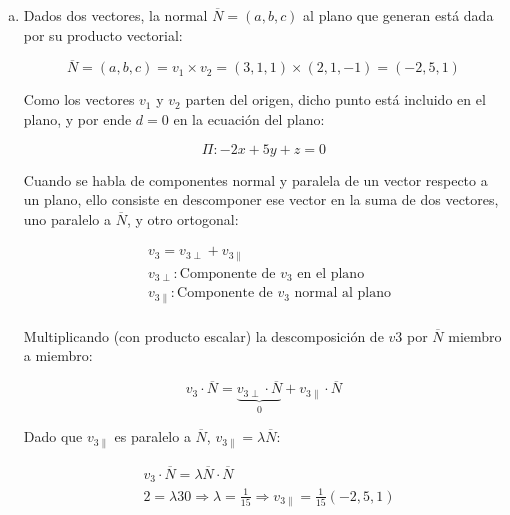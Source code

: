 \documentclass{article}
\begin{document}
\begin{enumerate}[(a)]
\item Dados dos vectores, la normal $\overline{N} = (a, b, c)$ al plano que generan está dada por su producto vectorial:

\begin{equation}
\overline{N} = (a, b, c) = v_1 \times v_2 = (3, 1, 1) \times (2, 1, -1) = (-2, 5, 1)
\end{equation}

Como los vectores $v_1$ y $v_2$ parten del origen, dicho punto está incluido en el plano, y por ende $d = 0$ en la ecuación del plano:

\begin{equation}
\Pi: -2x + 5y + z = 0
\end{equation}

Cuando se habla de componentes normal y paralela de un vector respecto a un plano, ello consiste en descomponer ese vector en la suma de dos vectores, uno paralelo a $\overline{N}$, y otro ortogonal:

\begin{subequations}
\begin{align}
& v_3 = v_{3\perp} + v_{3\parallel} \\
& v_{3\perp}: \text{Componente de } v_3 \text{ en el plano} \\
& v_{3\parallel}: \text{Componente de } v_3 \text{ normal al plano} \\
\end{align}
\end{subequations}

Multiplicando (con producto escalar) la descomposición de $v3$ por $\overline{N}$ miembro a miembro:

\begin{equation}
v_3 \cdot \overline{N} = \underbrace{ v_{3\perp} \cdot \overline{N} }_{0} + v_{3\parallel} \cdot \overline{N}
\end{equation}

Dado que $v_{3\parallel}$ es paralelo a $\overline{N}$, $v_{3\parallel} = \lambda \overline{N}$:

\begin{subequations}
\begin{align}
& v_3 \cdot \overline{N} = \lambda \overline{N} \cdot \overline{N} \\
& 2 = \lambda 30 \Rightarrow \lambda = \frac{1}{15} \Rightarrow v_{3\parallel} = \frac{1}{15} (-2, 5, 1)
\end{align}
\end{subequations}


\end{enumerate}
\end{document}
